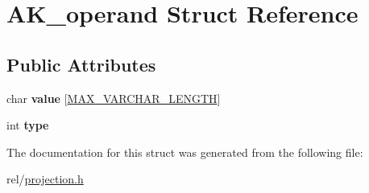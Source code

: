 \hypertarget{structAK__operand}{}\section{A\+K\+\_\+operand Struct Reference}
\label{structAK__operand}
\subsection*{Public Attributes}
\begin{DoxyCompactItemize}
\item 
\mbox{\label{structAK__operand_a9fd0833ae5b5b0f941867df3e82097b7}} 
char {\bfseries value} \mbox{[}\hyperlink{constants_8h_a9de30df5b4220028fba997e5def2e9d7}{M\+A\+X\+\_\+\+V\+A\+R\+C\+H\+A\+R\+\_\+\+L\+E\+N\+G\+TH}\mbox{]}
\item 
\mbox{\label{structAK__operand_a35d1d26732b3bd118c490bc1e34830ed}} 
int {\bfseries type}
\end{DoxyCompactItemize}


The documentation for this struct was generated from the following file\+:\begin{DoxyCompactItemize}
\item 
rel/\hyperlink{projection_8h}{projection.\+h}\end{DoxyCompactItemize}
